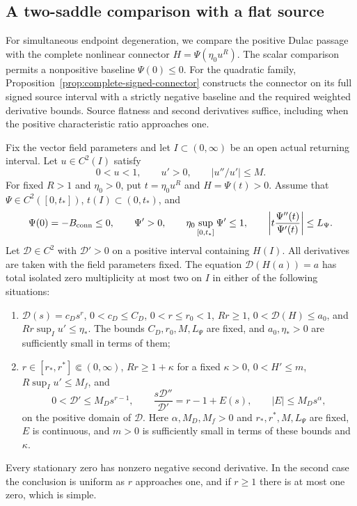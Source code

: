 \subsection{A two-saddle comparison with a flat source}
\label{subsec:flat-source-comparison}
For simultaneous endpoint degeneration, we compare the positive Dulac
passage with the complete nonlinear connector $H=\Psi(\eta_0u^R)$.
The scalar comparison permits a nonpositive baseline $\Psi(0)\le0$.
For the quadratic family, Proposition~\ref{prop:complete-signed-connector}
constructs the connector on its full signed source interval with a
strictly negative baseline and the required weighted derivative bounds.
Source flatness and second derivatives suffice, including when the
positive characteristic ratio approaches one.

\begin{lemma}
\label{lem:flat-two-saddle-comparison}
Fix the vector field parameters and let $I\subset(0,\infty)$ be an open
actual returning interval. Let $u\in C^2(I)$ satisfy
\[
 0<u<1,\qquad u'>0,\qquad |u''/u'|\le M.
\]
For fixed $R>1$ and $\eta_0>0$, put
$t=\eta_0u^R$ and $H=\Psi(t)>0$. Assume that
$\Psi\in C^2([0,t_*])$, $t(I)\subset(0,t_*)$, and
\[
 \Psi(0)=-B_{\rm conn}\le0,\qquad \Psi'>0,\qquad
 \eta_0\sup_{[0,t_*]}\Psi'\le1,\qquad
 \left|t\frac{\Psi''(t)}{\Psi'(t)}\right|\le L_\Psi.
\]
Let $\mathcal D\in C^2$ with $\mathcal D'>0$ on a positive interval
containing $H(I)$. All derivatives are taken with the field parameters
fixed. The equation $\mathcal D(H(a))=a$ has total isolated zero
multiplicity at most two on $I$ in either of the following situations:
\begin{enumerate}
 \item $\mathcal D(s)=c_Ds^r$, $0<c_D\le C_D$,
       $0<r\le r_0<1$, $Rr\ge1$, $0<\mathcal D(H)\le a_0$, and
       $Rr\sup_Iu'\le\eta_*$. The bounds $C_D,r_0,M,L_\Psi$ are fixed,
       and $a_0,\eta_*>0$ are sufficiently small in terms of them;
 \item $r\in[r_*,r^*]\Subset(0,\infty)$, $Rr\ge1+\kappa$ for a fixed
       $\kappa>0$,
       $0<H'\le m$, $R\sup_Iu'\le M_f$, and
       \begin{equation}\label{eq:lower-dulac-jets}
        0<\mathcal D'\le M_Ds^{r-1},\qquad
        \frac{s\mathcal D''}{\mathcal D'}=r-1+E(s),\qquad
        |E|\le M_Ds^\alpha,
       \end{equation}
       on the positive domain of $\mathcal D$. Here
       $\alpha,M_D,M_f>0$ and $r_*,r^*,M,L_\Psi$ are fixed,
       $E$ is continuous, and $m>0$ is sufficiently small in terms of
       these bounds and $\kappa$.
\end{enumerate}
Every stationary zero has nonzero negative second derivative.
In the second case the conclusion is uniform as $r$ approaches one,
and if $r\ge1$ there is at most one zero, which is simple.
\end{lemma}

